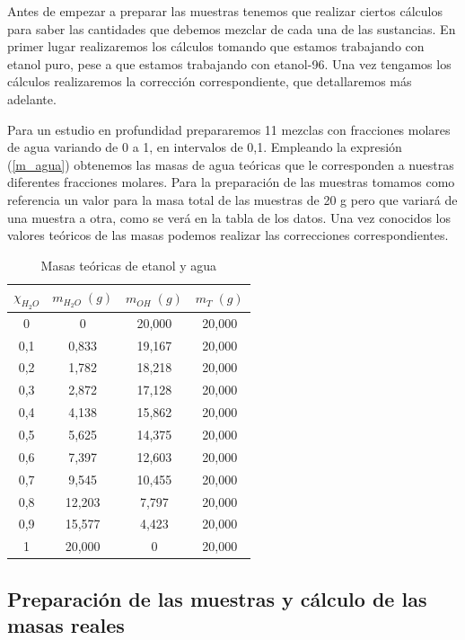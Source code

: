\documentclass[a4paper,12pt,titlepage]{article}
\begin{document}
Antes de empezar a preparar las muestras tenemos que realizar ciertos cálculos para saber las cantidades que debemos mezclar de cada una de las sustancias. En primer lugar realizaremos los cálculos tomando que estamos trabajando con etanol puro, pese a que estamos trabajando con etanol-96. Una vez tengamos los cálculos realizaremos la corrección correspondiente, que detallaremos más adelante.

Para un estudio en profundidad prepararemos 11 mezclas con fracciones molares de agua variando de 0 a 1, en intervalos de 0,1. Empleando la expresión (\ref{m_agua}) obtenemos las masas de agua teóricas que le corresponden a nuestras diferentes fracciones molares. Para la preparación de las muestras tomamos como referencia un valor para la masa total de las muestras de 20 g pero que variará de una muestra a otra, como se verá en la tabla de los datos. Una vez conocidos los valores teóricos de las masas podemos realizar las correcciones correspondientes.

\begin{table}[h!]
\centering
\begin{tabular}{|c|c|c|c|}
\hline
$\chi_{H_2O}$ & $m_{H_2O} \;(g)$  & $m_{OH}\;(g)$ & $m_T\;(g)$ \\ \hline
0     & 0      & 20,000 & 20,000  \\ \hline
0,1   & 0,833  & 19,167 & 20,000  \\ \hline
0,2   & 1,782  & 18,218 & 20,000  \\ \hline
0,3   & 2,872  & 17,128 & 20,000  \\ \hline
0,4   & 4,138  & 15,862 & 20,000  \\ \hline
0,5   & 5,625  & 14,375 & 20,000  \\ \hline
0,6   & 7,397  & 12,603 & 20,000  \\ \hline
0,7   & 9,545  & 10,455 & 20,000  \\ \hline
0,8   & 12,203 & 7,797  & 20,000  \\ \hline
0,9   & 15,577 & 4,423  & 20,000  \\ \hline
1     & 20,000 & 0      & 20,000  \\ \hline
\end{tabular}
\caption{Masas teóricas de etanol y agua}
\label{tab:my-table}
\end{table}

\subsection{Preparación de las muestras y cálculo de las masas reales}
\end{document}
